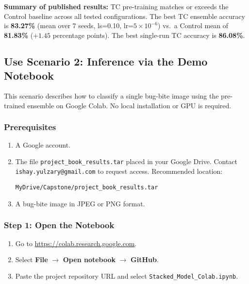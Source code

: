 \documentclass[12pt,a4paper]{article}
\begin{document}
\textbf{Summary of published results:} TC pre-training matches or exceeds
the Control baseline across all tested configurations. The best TC ensemble
accuracy is \textbf{83.27\%} (mean over 7 seeds, ls=0.10,
lr=$5\times10^{-6}$) vs.\ a Control mean of \textbf{81.83\%}
($+1.45$ percentage points). The best single-run TC accuracy is
\textbf{86.08\%}.

\subsection{Use Scenario 2: Inference via the Demo Notebook}
\label{sec:ug-inference}

This scenario describes how to classify a single bug-bite image using the
pre-trained ensemble on Google Colab. No local installation or GPU is
required.

\subsubsection{Prerequisites}

\begin{enumerate}
    \item A Google account.
    \item The file \texttt{project\_book\_results.tar} placed in your
          Google Drive. Contact \texttt{ishay.yulzary@gmail.com} to
          request access. Recommended location:
\begin{lstlisting}
MyDrive/Capstone/project_book_results.tar
\end{lstlisting}
    \item A bug-bite image in JPEG or PNG format.
\end{enumerate}

\subsubsection{Step 1: Open the Notebook}

\begin{enumerate}
    \item Go to \url{https://colab.research.google.com}.
    \item Select \textbf{File} $\rightarrow$ \textbf{Open notebook}
          $\rightarrow$ \textbf{GitHub}.
    \item Paste the project repository URL and select
          \texttt{Stacked\_Model\_Colab.ipynb}.
\end{enumerate}
\end{document}
